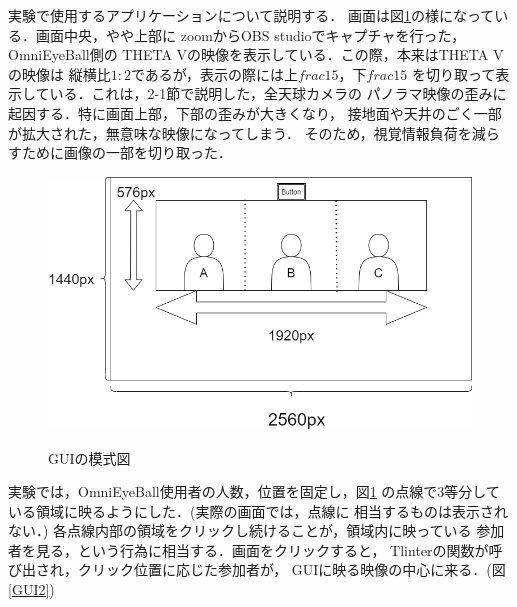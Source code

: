 

実験で使用するアプリケーションについて説明する．
画面は図\ref{GUI1}の様になっている．画面中央，やや上部に
zoomからOBS studioでキャプチャを行った，OmniEyeBall側の
THETA Vの映像を表示している．この際，本来はTHETA Vの映像は
縦横比$1:2$であるが，表示の際には上$frac{1}{5}$，下$frac{1}{5}$
を切り取って表示している．これは，2-1節で説明した，全天球カメラの
パノラマ映像の歪みに起因する．特に画面上部，下部の歪みが大きくなり，
接地面や天井のごく一部が拡大された，無意味な映像になってしまう．
そのため，視覚情報負荷を減らすために画像の一部を切り取った．

\begin{figure}[tbp]
  \centering
  \includegraphics[scale=0.5]{fig/GUI1.png}\label{GUI1}
  \caption{GUIの模式図}
\end{figure}

実験では，OmniEyeBall使用者の人数，位置を固定し，図\ref{GUI1}
の点線で3等分している領域に映るようにした．(実際の画面では，点線に
相当するものは表示されない．)
各点線内部の領域をクリックし続けることが，領域内に映っている
参加者を見る，という行為に相当する．画面をクリックすると，
Tlinterの関数が呼び出され，クリック位置に応じた参加者が，
GUIに映る映像の中心に来る．(図\ref{GUI2})

